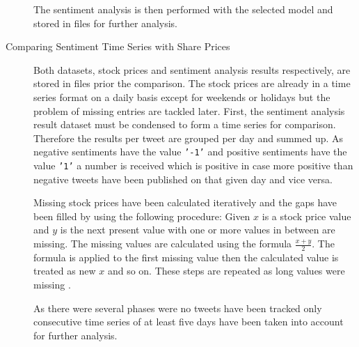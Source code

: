 \begin{description}
    The sentiment analysis is then performed with the selected model and stored in files for further analysis.

  \item[Comparing Sentiment Time Series with Share Prices]
    
    Both datasets, stock prices and sentiment analysis results respectively, are stored in files prior the comparison.
    The stock prices are already in a time series format on a daily basis except for weekends or holidays but the problem of missing entries are tackled later.
    First, the sentiment analysis result dataset must be condensed to form a time series for comparison.
    Therefore the results per tweet are grouped per day and summed up.
    As negative sentiments have the value \texttt{'-1'} and positive sentiments have the value \texttt{'1'} a number is received which is positive in case more positive than negative tweets have been published on that given day and vice versa. 

    Missing stock prices have been calculated iteratively and the gaps have been filled by using the following procedure:
    Given $x$ is a stock price value and $y$ is the next present value with one or more values in between are missing.
    The missing values are calculated using the formula $\frac{x+y}{2}$.
    The formula is applied to the first missing value then the calculated value is treated as new $x$ and so on.
    These steps are repeated as long values were missing
    \citep{Pagolu2016a}.

    As there were several phases were no tweets have been tracked only consecutive time series of at least five days have been taken into account for further analysis.

\end{description}